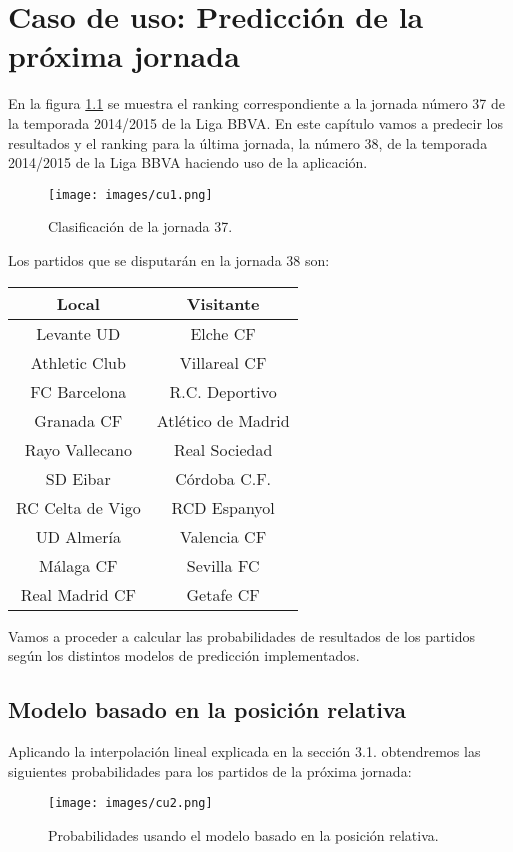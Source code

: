 
\chapter{Caso de uso: Predicción de la próxima jornada}

En la figura \ref{fig:clas37} se muestra el ranking correspondiente a la jornada número 37 de la temporada 2014/2015 de la Liga BBVA. En este capítulo vamos a predecir los resultados y el ranking para la última jornada, la número 38, de la temporada 2014/2015 de la Liga BBVA haciendo uso de la aplicación.
\begin{figure}[H]
	\centering
	\texttt{[image: images/cu1.png]}
	\caption{Clasificación de la jornada 37.} \label{fig:clas37}
\end{figure}

 Los partidos que se disputarán en la jornada 38 son:
\begin{center}
	\begin{tabular}{|c|c|}
	\hline \rowcolor{ao} Local & Visitante \\ 
	\hline Levante UD & Elche CF \\ 
	\hline Athletic Club & Villareal CF \\ 
	\hline FC Barcelona & R.C. Deportivo \\ 
	\hline Granada CF & Atlético de Madrid \\ 
	\hline Rayo Vallecano & Real Sociedad \\ 
	\hline SD Eibar & Córdoba C.F. \\ 
	\hline RC Celta de Vigo & RCD Espanyol \\ 
	\hline UD Almería & Valencia CF \\ 
	\hline Málaga CF & Sevilla FC \\ 
	\hline Real Madrid CF & Getafe CF \\ 
	\hline 
\end{tabular} 
\end{center}

Vamos a proceder a calcular las probabilidades de resultados de los partidos según los distintos modelos de predicción implementados.

\section{Modelo basado en la posición relativa}
Aplicando la interpolación lineal explicada en la sección 3.1. obtendremos las siguientes probabilidades para los partidos de la próxima jornada:
\begin{figure}[H]
	\centering
	\texttt{[image: images/cu2.png]}
	\caption{Probabilidades usando el modelo basado en la posición relativa.} \label{fig:pred1}
\end{figure}


